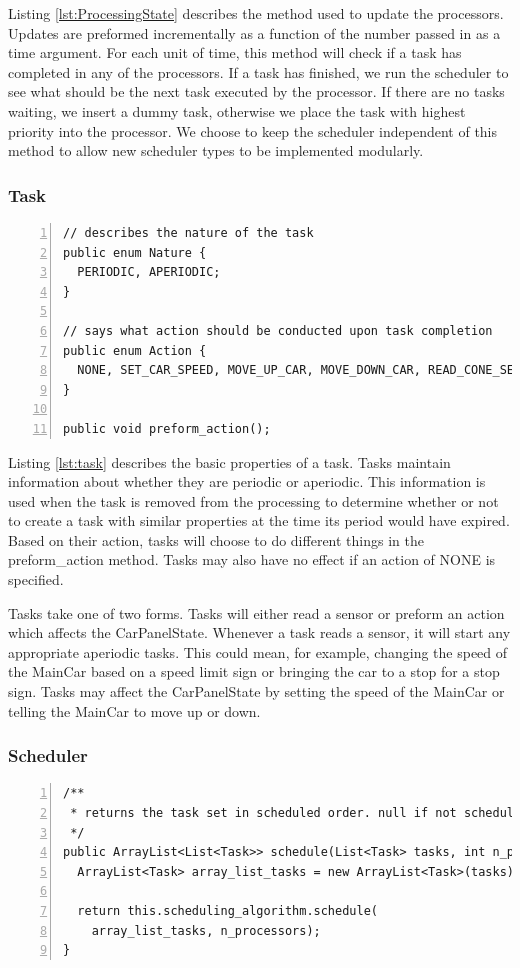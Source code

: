 \documentclass{article} %
\begin{document}
Listing \ref{lst:ProcessingState} describes the method used to update the processors.
Updates are preformed incrementally as a function of the number passed in as a time argument.
For each unit of time, this method will check if a task has completed in any of the processors.
If a task has finished, we run the scheduler to see what should be the next task executed by the processor.
If there are no tasks waiting, we insert a dummy task, otherwise we place the task with highest priority into the processor.
We choose to keep the scheduler independent of this method to allow new scheduler types to be implemented modularly.

\subsubsection{Task}
\begin{lstlisting}[caption={Tasks know how to preform their actions},label={lst:task},numbers=left]
// describes the nature of the task
public enum Nature {
  PERIODIC, APERIODIC;
}

// says what action should be conducted upon task completion
public enum Action {
  NONE, SET_CAR_SPEED, MOVE_UP_CAR, MOVE_DOWN_CAR, READ_CONE_SENSOR, READ_OTHER_CAR_SENSOR, READ_SPEED_SIGN_SENSOR, READ_STOP_SIGN_SENSOR;
}

public void preform_action();
\end{lstlisting}

Listing \ref{lst:task} describes the basic properties of a task.
Tasks maintain information about whether they are periodic or aperiodic.
This information is used when the task is removed from the processing to determine whether or not to create a task with similar properties at the time its period would have expired.
Based on their action, tasks will choose to do different things in the preform\_action method. 
Tasks may also have no effect if an action of NONE is specified.

Tasks take one of two forms.
Tasks will either read a sensor or preform an action which affects the CarPanelState.
Whenever a task reads a sensor, it will start any appropriate aperiodic tasks.
This could mean, for example, changing the speed of the MainCar based on a speed limit sign or bringing the car to a stop for a stop sign.
Tasks may affect the CarPanelState by setting the speed of the MainCar or telling the MainCar to move up or down.

\subsubsection{Scheduler}
\begin{lstlisting}[caption={The scheduler uses a scheduling algorithm to choose the order of tasks},label={lst:scheduler},numbers=left]
/**
 * returns the task set in scheduled order. null if not schedulable.
 */
public ArrayList<List<Task>> schedule(List<Task> tasks, int n_processors) {
  ArrayList<Task> array_list_tasks = new ArrayList<Task>(tasks);

  return this.scheduling_algorithm.schedule(
    array_list_tasks, n_processors);
}
\end{lstlisting}
\end{document}
